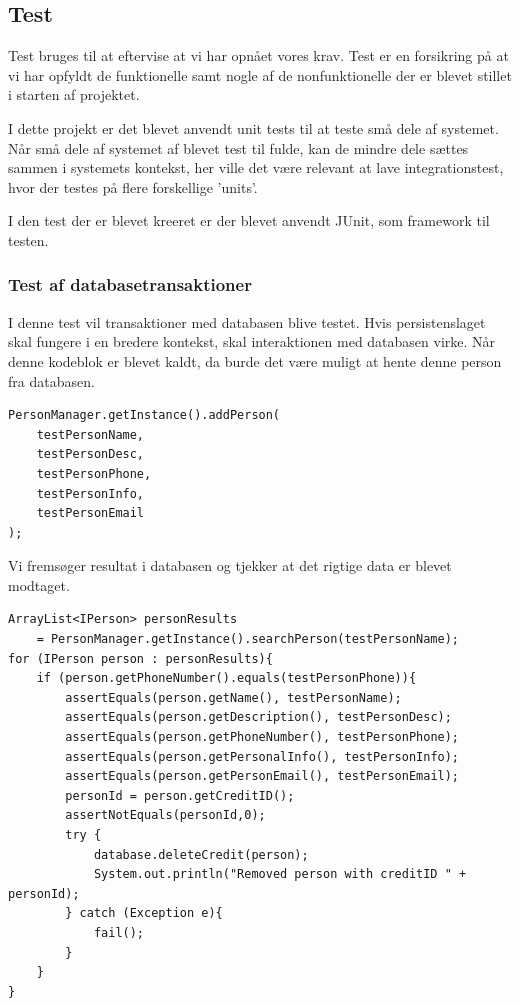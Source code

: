 \newpage
\subsection{Test}

Test bruges til at eftervise at vi har opnået vores krav. Test er en forsikring
på at vi har opfyldt de funktionelle samt nogle af de nonfunktionelle der er
blevet stillet i starten af projektet.

I dette projekt er det blevet anvendt unit tests til at teste små dele af
systemet. Når små dele af systemet af blevet test til fulde, kan de mindre dele
sættes sammen i systemets kontekst, her ville det være relevant at lave
integrationstest, hvor der testes på flere forskellige 'units'.

I den test der er blevet kreeret er der blevet anvendt JUnit, som framework til
testen.

\subsubsection{Test af databasetransaktioner}%
\label{ssub:test_af_database_transaktioner}

I denne test vil transaktioner med databasen blive testet. Hvis
persistenslaget skal fungere i en bredere kontekst, skal interaktionen med
databasen virke. Når denne kodeblok er blevet kaldt, da burde det være muligt at
hente denne person fra databasen.

\begin{lstlisting}
PersonManager.getInstance().addPerson(
    testPersonName,
    testPersonDesc,
    testPersonPhone,
    testPersonInfo,
    testPersonEmail
);
\end{lstlisting}

Vi fremsøger resultat i databasen og tjekker at det rigtige data er blevet
modtaget.

\begin{lstlisting}
ArrayList<IPerson> personResults 
    = PersonManager.getInstance().searchPerson(testPersonName);
for (IPerson person : personResults){
    if (person.getPhoneNumber().equals(testPersonPhone)){
        assertEquals(person.getName(), testPersonName);
        assertEquals(person.getDescription(), testPersonDesc);
        assertEquals(person.getPhoneNumber(), testPersonPhone);
        assertEquals(person.getPersonalInfo(), testPersonInfo);
        assertEquals(person.getPersonEmail(), testPersonEmail);
        personId = person.getCreditID();
        assertNotEquals(personId,0);
        try {
            database.deleteCredit(person);
            System.out.println("Removed person with creditID " + personId);
        } catch (Exception e){
            fail();
        }
    }
}
\end{lstlisting}

